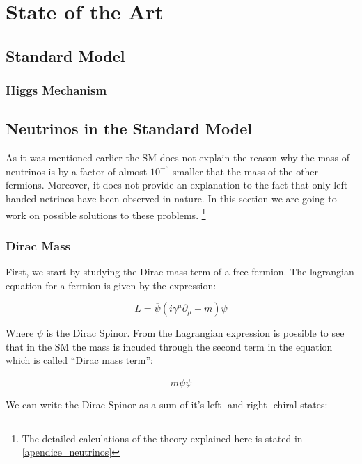 \chapter{State of the Art} 

\section{Standard Model}

\subsection{Higgs Mechanism}

\section{Neutrinos in the Standard Model}

As it was mentioned earlier the SM does not explain the reason why the mass of neutrinos is by a factor of almost $10^{-6}$ smaller that the mass of the other fermions. Moreover, it does not
provide an explanation to the fact that only left handed netrinos have been observed in nature. 
In this section we are going to work on possible solutions to these problems. \footnote{The detailed calculations of the theory explained here is stated in \ref{apendice_neutrinos}}

\subsection{Dirac Mass}

First, we start by studying the Dirac mass term of a free fermion. The lagrangian equation for  a fermion is given by the expression:

\begin{equation}
 L = \overline{\psi} \left( i \gamma ^\mu \partial_{\mu} - m \right) \psi
\end{equation}

Where $\psi$ is the Dirac Spinor. From the Lagrangian expression is possible to see that in the SM the mass is incuded through the second term in the equation which is called ``Dirac mass term'':

\begin{equation}
 m \overline{\psi} \psi
\end{equation}

We can write the Dirac Spinor as a sum of it's left- and right- chiral states:

